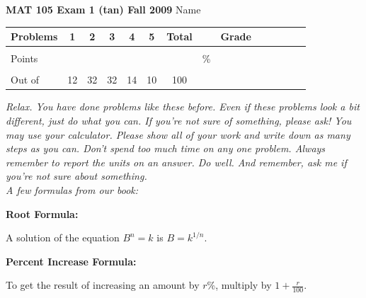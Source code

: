\documentclass[12pt]{article}
\begin{document}
\textbf{MAT 105 Exam 1 (tan) Fall 2009} \hspace{.4in} {\large Name} \hrulefill

\begin{center}

\begin{tabular}
{|l|c|c|c|c|c|c|c|c|c|c|c|c|c|} \hline

 Problems & \hspace{5 pt} 1 \hspace{5 pt}  & \hspace{5 pt} 2 \hspace{5 pt} & \hspace{5 pt} 3 \hspace{5 pt} & \hspace{5 pt} 4 \hspace{5 pt} & \hspace{5 pt} 5 \hspace{5 pt} & \hspace{5 pt} Total  \hspace{5 pt} & &  \hspace{5 pt} Grade \hspace{5 pt}  \\ \hline
&&&&&&&&\\  
Points &&&&&&&    \hspace{.8in}\% &  \\ 
&&&&&&&& \\  \hline
Out of & 12 & 32 & 32 & 14 & 10 &100 & & \\ \hline

\end {tabular}

\end{center}

\vspace{.2in}

 \emph{Relax.  You have done problems like these before.  Even if these problems look a bit different, just do what you can.  If you're not sure of something, please ask! You may use your calculator.  Please show all of your work and write down as many steps as you can.  Don't spend too much time on any one problem.  Always remember to report the units on an answer. Do well.  And remember, ask me if you're not sure about something.}\\

\vspace{.5in} 
\noindent \emph{A few formulas from our book:}

\begin{center}

\textbf{Root Formula:} 

A solution of the equation $B^n=k$ is $B=k^{1/n}$.

\vspace{.2in} 

\textbf{Percent Increase Formula:} 

To get the result of increasing an amount by $r$\%, multiply by $1 + \frac{r}{100}$.

\end{center}
\end{document}
